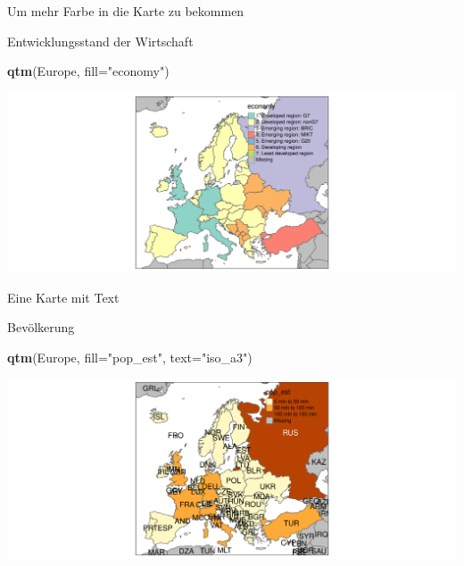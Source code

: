 \documentclass[ignorenonframetext,]{beamer}
\newenvironment{Shaded}{\begin{snugshade}}{\end{snugshade}}
\newcommand{\KeywordTok}[1]{\textcolor[rgb]{0.13,0.29,0.53}{\textbf{#1}}}
\newcommand{\DataTypeTok}[1]{\textcolor[rgb]{0.13,0.29,0.53}{#1}}
\newcommand{\StringTok}[1]{\textcolor[rgb]{0.31,0.60,0.02}{#1}}
\newcommand{\NormalTok}[1]{#1}
\begin{document}
\begin{frame}[fragile]{Um mehr Farbe in die Karte zu bekommen}

\begin{block}{Entwicklungsstand der Wirtschaft}

\begin{Shaded}
\begin{Highlighting}[]
\KeywordTok{qtm}\NormalTok{(Europe, }\DataTypeTok{fill=}\StringTok{"economy"}\NormalTok{)}
\end{Highlighting}
\end{Shaded}

\includegraphics{tmap_files/figure-beamer/unnamed-chunk-9-1.pdf}

\end{block}

\end{frame}

\begin{frame}[fragile]{Eine Karte mit Text}

\begin{block}{Bevölkerung}

\begin{Shaded}
\begin{Highlighting}[]
\KeywordTok{qtm}\NormalTok{(Europe, }\DataTypeTok{fill=}\StringTok{"pop_est"}\NormalTok{, }\DataTypeTok{text=}\StringTok{"iso_a3"}\NormalTok{)}
\end{Highlighting}
\end{Shaded}

\includegraphics{tmap_files/figure-beamer/unnamed-chunk-10-1.pdf}

\end{block}

\end{frame}
\end{document}
